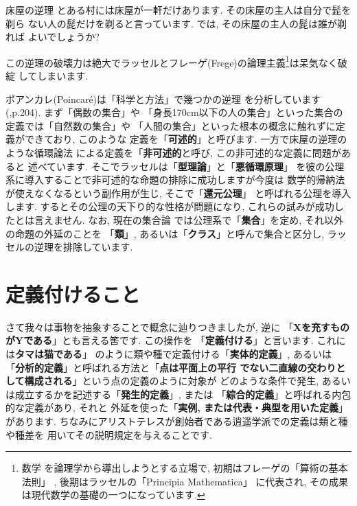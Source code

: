 \documentclass[b5j,8pt,twocolumn]{ltjsarticle}
\begin{document}
\begin{itembox}[c]{{床屋の逆理}}
\quad とある村には床屋が一軒だけあります. その床屋の主人は自分で髭を剃ら
ない人の髭だけを剃ると言っています. では, その床屋の主人の髭は誰が剃れば
よいでしょうか?
\end{itembox}


この逆理の破壊力は絶大でラッセルとフレーゲ(Frege)の論理主義\footnote{数学
を論理学から導出しようとする立場で, 初期はフレーゲの「算術の基本法則」
\cite{フレーゲ}, 後期はラッセルの「Principia Mathematica」\cite{Russell}
に代表され, その成果は現代数学の基礎の一つになっています.}は呆気なく破綻
してしまいます.
\newline


ポアンカレ(Poincar\'e)は「科学と方法」\cite{ポアンカレ}で幾つかの逆理
を分析しています(\cite{ポアンカレ},p.204). まず「偶数の集合」や
「身長170cm以下の人の集合」といった集合の定義では「自然数の集合」や
「人間の集合」といった根本の概念に触れずに定義ができており, このような
定義を「\textbf{可述的}」と呼びます. 一方で床屋の逆理のような循環論法
による定義を「\textbf{非可述的}と呼び, この非可述的な定義に問題があると
述べています. そこでラッセルは「\textbf{型理論}」と「\textbf{悪循環原理}」
を彼の公理系に導入することで非可述的な命題の排除に成功しますが今度は
数学的帰納法が使えなくなるという副作用が生じ,  そこで「\textbf{還元公理}」
と呼ばれる公理を導入します.  するとその公理の天下り的な性格が問題になり,
 これらの試みが成功したとは言えません\cite{Russell}. なお, 現在の集合論
では公理系で「\textbf{集合}」を定め, それ以外の命題の外延のことを
「\textbf{類}」, あるいは「\textbf{クラス}」と呼んで集合と区分し,
 ラッセルの逆理を排除しています.

\section{定義付けること}

さて我々は事物を抽象することで概念に辿りつきましたが, 逆に
「\textbf{Xを充すものがYである}」とも言える筈です. この操作を
「\textbf{定義付ける}」と言います. これには\textbf{タマは猫である}」
のように類や種で定義付ける「\textbf{実体的定義}」, あるいは
「\textbf{分析的定義}」と呼ばれる方法と「\textbf{点は平面上の平行
でない二直線の交わりとして構成される}」という点の定義のように対象が
どのような条件で発生, あるいは成立するかを記述する「\textbf{発生的定義}」,
 または 「\textbf{綜合的定義}」と呼ばれる内包的な定義があり, それと
外延を使った「\textbf{実例, または代表・典型を用いた定義}」があります.
 ちなみにアリストテレスが創始者である逍遥学派での定義は類と種や種差を
用いてその説明規定を与えることです.
\end{document}
